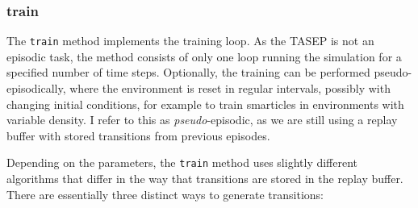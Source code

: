 \subsubsection{train}
\label{subsubsec:implementation-train}
The \texttt{train} method implements the training loop. As the TASEP is not an episodic task, the method consists of only one loop running the simulation for a specified number of time steps. Optionally, the training can be performed pseudo-episodically, where the environment is reset in regular intervals, possibly with changing initial conditions, for example to train smarticles in environments with variable density. I refer to this as \textit{pseudo}-episodic, as we are still using a replay buffer with stored transitions from previous episodes.


Depending on the parameters, the \texttt{train} method uses slightly different algorithms that differ in the way that transitions are stored in the replay buffer. There are essentially three distinct ways to generate transitions:
